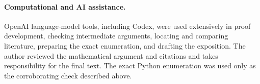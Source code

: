 \documentclass[11pt]{article}
\begin{document}
\paragraph{Computational and AI assistance.}
OpenAI language-model tools, including Codex, were used extensively in proof
development, checking intermediate arguments, locating and comparing
literature, preparing the exact enumeration, and drafting the exposition.
The author reviewed the mathematical argument and citations and takes
responsibility for the final text.  The exact Python enumeration was used
only as the corroborating check described above.

\small


\end{document}

